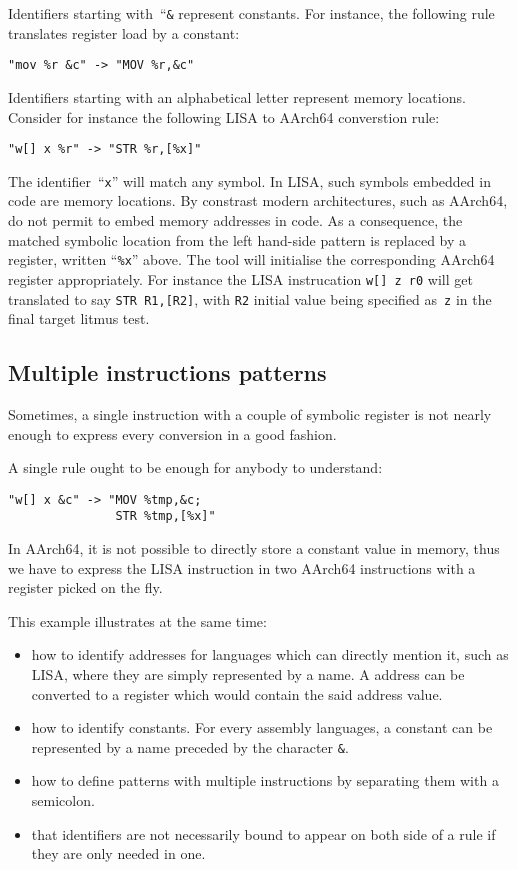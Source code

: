 Identifiers starting with~``\verb+&+ represent constants.
For instance, the following rule translates register load by a constant:
\begin{verbatim}
"mov %r &c" -> "MOV %r,&c"
\end{verbatim}

Identifiers starting with an alphabetical letter represent memory locations.
Consider for instance the following LISA to AArch64 converstion rule:
\begin{verbatim}
"w[] x %r" -> "STR %r,[%x]"
\end{verbatim}
The identifier~``\verb+x+'' will match any symbol.
In LISA, such symbols embedded in code are memory locations.
By constrast modern architectures, such as AArch64, do
not permit to embed memory addresses in code.
As a consequence, the matched symbolic location from the left hand-side
pattern is replaced by a register, written ``\verb+%x+'' above.
The tool \jingle{} will initialise the corresponding AArch64 register
appropriately.
For instance the LISA instrucation \verb+w[] z r0+ will get translated
to say \verb+STR R1,[R2]+, with \verb+R2+ initial value being specified
as~\verb+z+ in the final target litmus test.



\subsection{Multiple instructions patterns}
Sometimes, a single instruction with a couple of symbolic register
is not nearly enough to express every conversion in a good fashion.

A single rule ought to be enough for anybody to understand:
\begin{verbatim}
"w[] x &c" -> "MOV %tmp,&c;
               STR %tmp,[%x]"
\end{verbatim}

In AArch64, it is not possible to directly store a constant value in memory,
thus we have to express the LISA instruction in two AArch64 instructions
with a register picked on the fly.

This example illustrates at the same time:
\begin{itemize}
\item how to identify addresses for languages which can directly mention it,
such as LISA, where they are simply represented by a name. A address can
be converted to a register which would contain the said address value.
\item how to identify constants. For every assembly languages, a constant can be
represented by a name preceded by the character \verb+&+.
\item how to define patterns with multiple instructions by separating them
with a semicolon.
\item that identifiers are not necessarily bound to appear on both side of
a rule if they are only needed in one.
\end{itemize}

